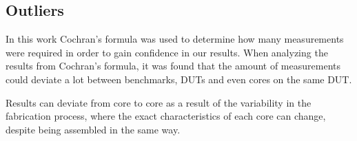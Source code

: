 \subsection{Outliers}

In this work Cochran's formula was used to determine how many measurements were required in order to gain confidence in our results. When analyzing the results from Cochran's formula, it was found that the amount of measurements could deviate a lot between benchmarks, DUTs and even cores on the same DUT.

Results can deviate from core to core as a result of the variability in the fabrication process, where the exact characteristics of each core can change, despite being assembled in the same way.\cite{Mauzy2020}






